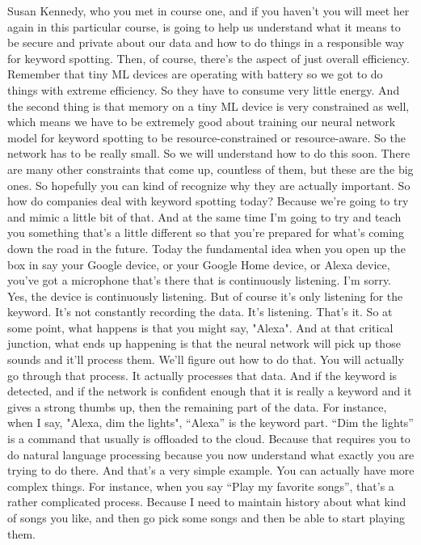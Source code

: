 Susan Kennedy, who you met in course one,
and if you haven't you will meet her again in this particular course,
is going to help us understand what it means
to be secure and private about our data and how
to do things in a responsible way for keyword spotting.
Then, of course, there's the aspect of just overall efficiency.
Remember that tiny ML devices are operating with battery so we got
to do things with extreme efficiency.
So they have to consume very little energy.
And the second thing is that memory on a tiny ML device
is very constrained as well, which means we
have to be extremely good about training our neural network model for keyword
spotting to be resource-constrained or resource-aware.
So the network has to be really small.
So we will understand how to do this soon.
There are many other constraints that come up, countless of them,
but these are the big ones.
So hopefully you can kind of recognize why they are actually important.
So how do companies deal with keyword spotting today?
Because we're going to try and mimic a little bit of that.
And at the same time I'm going to try and teach you
something that's a little different so that you're prepared for what's
coming down the road in the future.
Today the fundamental idea when you open up
the box in say your Google device, or your Google Home device,
or Alexa device, you've got a microphone that's
there that is continuously listening.
I'm sorry.
Yes, the device is continuously listening.
But of course it's only listening for the keyword.
It's not constantly recording the data.
It's listening.
That's it.
So at some point, what happens is that you might say, "Alexa".
And at that critical junction, what ends up
happening is that the neural network will pick up those sounds
and it'll process them.
We'll figure out how to do that.
You will actually go through that process.
It actually processes that data.
And if the keyword is detected, and if the network is confident enough
that it is really a keyword and it gives a strong thumbs up,
then the remaining part of the data.
For instance, when I say, "Alexa, dim the lights",
``Alexa'' is the keyword part.
``Dim the lights'' is a command that usually is offloaded to the cloud.
Because that requires you to do natural language processing because you now
understand what exactly you are trying to do there.
And that's a very simple example.
You can actually have more complex things.
For instance, when you say ``Play my favorite songs'',
that's a rather complicated process.
Because I need to maintain history about what kind of songs you like,
and then go pick some songs and then be able to start playing them.
